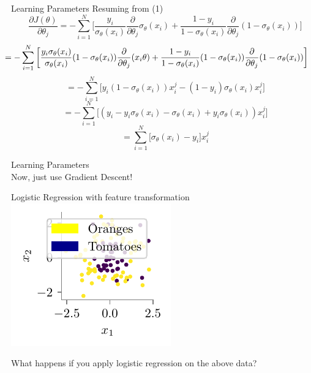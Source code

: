 \documentclass{beamer}
\begin{document}
\begin{frame}{Learning Parameters}
Resuming from (1)
\begin{equation*}
\frac{\partial J(\theta)}{\partial \theta_{j}} = -\sum_{i=1}^{N}\bigg[\frac{y_{i}}{\sigma_{\theta}(x_{i})} \frac{\partial}{\partial \theta_{j}} \sigma_{\theta}(x_{i}) + \frac{1 - y_{i}}{1 - \sigma_{\theta}(x_{i})} \frac{\partial}{\partial \theta_{j}}(1 - \sigma_{\theta}(x_{i}))\bigg]
\end{equation*}
\begin{equation*}
\hspace{-0.7cm}= -\sum_{i=1}^{N}\bigg[\frac{y_{i}\sigma_{\theta}(x_{i})}{\sigma_{\theta}(x_{i})}(1 - \sigma_{\theta}(x_{i}))\frac{\partial}{\partial \theta_{j}} (x_{i}\theta) + \frac{1 - y_{i}}{1 - \sigma_{\theta}(x_{i})}(1 - \sigma_{\theta}(x_{i})) \frac{\partial}{\partial \theta_{j}}(1 - \sigma_{\theta}(x_{i}))\bigg]
\end{equation*}
\begin{equation*}
= -\sum_{i=1}^{N}\bigg[y_{i}(1 - \sigma_{\theta}(x_{i}))x_{i}^{j} - (1 - y_{i})\sigma_{\theta}(x_{i})x_{i}^{j}\bigg]
\end{equation*}
\begin{equation*}
= -\sum_{i=1}^{N}\bigg[(y_{i} - y_{i}\sigma_{\theta}(x_{i}) - \sigma_{\theta}(x_{i}) + y_{i}\sigma_{\theta}(x_{i}))x_{i}^{j}\bigg]
\end{equation*}
\begin{equation*}
= \sum_{i=1}^{N}\bigg[\sigma_{\theta}(x_{i}) - y_{i}\bigg]x_{i}^{j}
\end{equation*}
\end{frame}
\begin{frame}{Learning Parameters}
\centering
{} \\
\vspace{0.3cm}
Now, just use Gradient Descent!
\end{frame}



\begin{frame}{Logistic Regression with feature transformation}
\includegraphics{../assets/logistic-regression/figures/logisitic-circular-data.pdf}

What happens if you apply logistic regression on the above data?
\end{frame}
\end{document}

